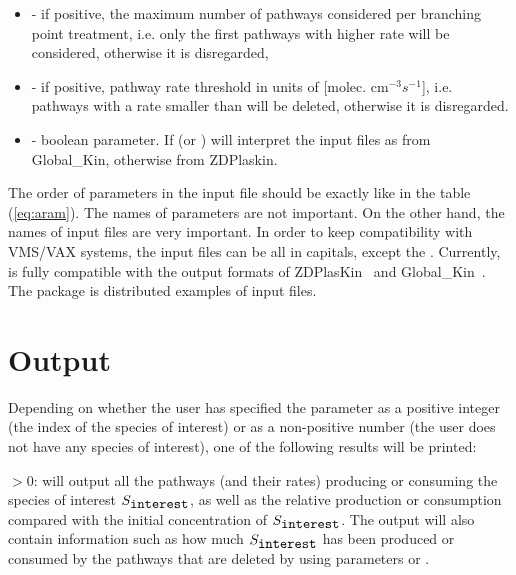 \begin{description}
\begin{itemize}
\item{ - if positive, the maximum number of pathways considered per branching point treatment, i.e. only the first  pathways with higher rate will be considered, otherwise it is disregarded,}
\item{ - if positive, pathway rate threshold in units of [molec. cm$^{-3}$$s^{-1}$], i.e. pathways with a rate smaller than  will be deleted, otherwise it is disregarded.}
\item{ - boolean parameter. If  (or )} \pump{} will interpret the input files as from Global\_Kin, otherwise from ZDPlaskin.
\end{itemize}
\end{description}

The order of parameters in the input file should be exactly like in the table (\ref{eq:aram}). The names of parameters are not important. On the other hand, the names of input files are very important. In order to keep compatibility with VMS/VAX systems, the input files can be all in capitals, except the . Currently, \pump{} 
is fully compatible with the output formats of ZDPlasKin~\cite{Zdplaskin,Flitti2009/EPJAP,Qtplaskin} and Global\_Kin~\cite{Dorai2002/JPD, Dorai2003/JPhD/1}.  The \pump{} package 
is distributed examples of input files. 


\section{Output}
\label{sec_3_2}

Depending on whether the user has specified the  parameter as a positive integer (the index of the species of interest) or as a non-positive number (the user does not have any species of interest), one of the following results will be printed:

 $> 0$: \pump{} will output all the pathways (and their rates) producing or consuming the species of interest $S_{\verb"interest"}$, as well as the relative production or consumption compared with the initial concentration of $S_{\verb"interest"}$. The output will also contain information such as how much $S_{\verb"interest"}$ has been produced or consumed by the pathways that are deleted by \pump{} using parameters  or . 

